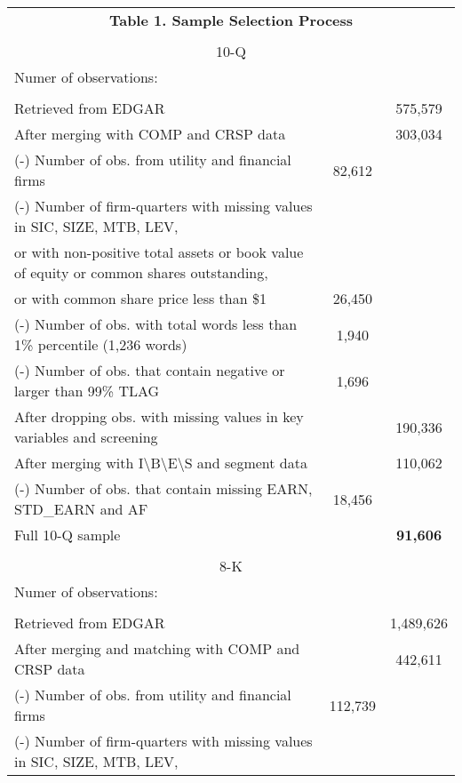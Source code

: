 \begin{table}[htbp] \label{T1}
  \centering
    \begin{tabular}{lcc}
    \multicolumn{3}{c}{\textbf{Table 1. Sample Selection Process}} \\ 
      & &  \\
    \multicolumn{3}{c}{10-Q} \\
    Numer of observations: &  &\\
      & &  \\
    Retrieved from EDGAR & & 575,579 \\
    After merging with COMP and CRSP data & & 303,034 \\
    (-) Number of obs. from utility and financial firms & 82,612 & \\
    (-) Number of firm-quarters with missing values in SIC, SIZE, MTB, LEV, & & \\
    \hspace{5mm}or with non-positive total assets or book value of equity or common shares outstanding, & & \\
    \hspace{5mm}or with common share price less than \$1 & 26,450 & \\
    (-) Number of obs. with total words less than 1\% percentile (1,236 words) & 1,940 & \\
    (-) Number of obs. that contain negative or larger than 99\% TLAG & 1,696 & \\
    \bottomrule
    After dropping obs. with missing values in key variables and screening & & 190,336 \\
    After merging with I\textbackslash{}B\textbackslash{}E\textbackslash{}S and segment data & & 110,062 \\
    (-) Number of obs. that contain missing EARN, STD\_EARN and AF & 18,456 & \\
    \bottomrule
    Full 10-Q sample & & \textbf{91,606} \\
      & &  \\
    \multicolumn{3}{c}{8-K} \\
    Numer of observations: & &  \\
      & &  \\
    Retrieved from EDGAR & & 1,489,626 \\
    After merging and matching with COMP and CRSP data  & & 442,611 \\
    (-) Number of obs. from utility and financial firms & 112,739 & \\
    (-) Number of firm-quarters with missing values in SIC, SIZE, MTB, LEV, & & \\

\end{tabular}
\end{table}
